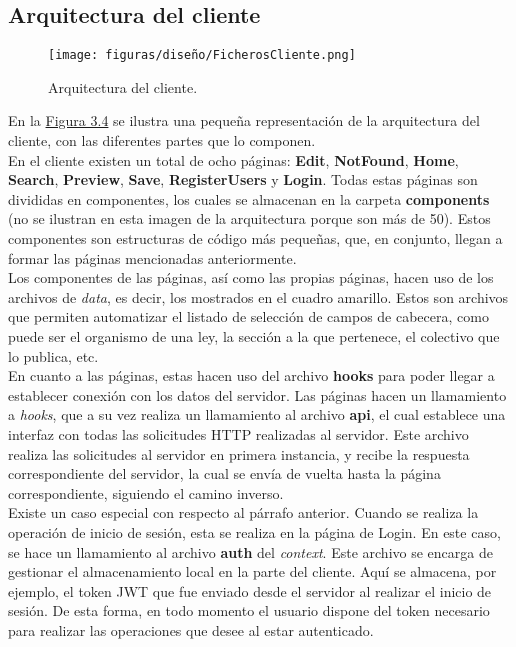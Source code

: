 \subsection{Arquitectura del cliente}

\begin{figure}[H]
\centerline{\texttt{[image: figuras/diseño/FicherosCliente.png]}}
\caption{Arquitectura del cliente.}
\label{enlaceArquitecturaCliente}
\end{figure}

En la \hyperref[enlaceArquitecturaCliente]{Figura 3.4} se ilustra una pequeña representación de la arquitectura del cliente, con las diferentes partes que lo componen.
\\

En el cliente existen un total de ocho páginas: {\bf Edit}, {\bf NotFound}, {\bf Home}, {\bf Search}, {\bf Preview}, {\bf Save}, {\bf RegisterUsers} y {\bf Login}. Todas estas páginas son divididas en componentes, los cuales se almacenan en la carpeta {\bf components} (no se ilustran en esta imagen de la arquitectura porque son más de 50). Estos componentes son estructuras de código más pequeñas, que, en conjunto, llegan a formar las páginas mencionadas anteriormente.
\\

Los componentes de las páginas, así como las propias páginas, hacen uso de los archivos de {\it data}, es decir, los mostrados en el cuadro amarillo. Estos son archivos que permiten automatizar el listado de selección de campos de cabecera, como puede ser el organismo de una ley, la sección a la que pertenece, el colectivo que lo publica, etc.
\\

En cuanto a las páginas, estas hacen uso del archivo {\bf hooks} para poder llegar a establecer conexión con los datos del servidor. Las páginas hacen un llamamiento a {\it hooks}, que a su vez realiza un llamamiento al archivo {\bf api}, el cual establece una interfaz con todas las solicitudes HTTP realizadas al servidor. Este archivo realiza las solicitudes al servidor en primera instancia, y recibe la respuesta correspondiente del servidor, la cual se envía de vuelta hasta la página correspondiente, siguiendo el camino inverso.
\\

Existe un caso especial con respecto al párrafo anterior. Cuando se realiza la operación de inicio de sesión, esta se realiza en la página de Login. En este caso, se hace un llamamiento al archivo {\bf auth} del {\it context}. Este archivo se encarga de gestionar el almacenamiento local en la parte del cliente. Aquí se almacena, por ejemplo, el token JWT que fue enviado desde el servidor al realizar el inicio de sesión. De esta forma, en todo momento el usuario dispone del token necesario para realizar las operaciones que desee al estar autenticado.